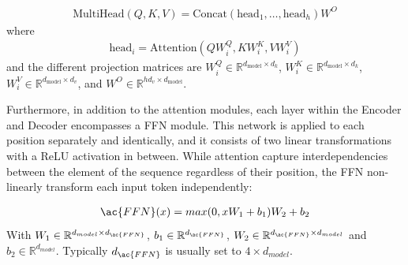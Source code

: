 \begin{align}
\text{MultiHead}(Q, K, V) = \text{Concat}(\text{head}_1, \dots, \text{head}_h)W^O
\end{align}
where
\begin{align}
\text{head}_i = \text{Attention}(QW_i^Q, KW_i^K, VW_i^V)
\end{align}
and the different projection matrices are $W_i^Q \in \mathbb{R}^{d_{\text{model}} \times d_k}$, $W_i^K \in \mathbb{R}^{d_{\text{model}} \times d_k}$, $W_i^V \in \mathbb{R}^{d_{\text{model}} \times d_v}$, and $W^O \in \mathbb{R}^{hd_{v} \times d_{\text{model}}}$.


Furthermore, in addition to the attention modules, each layer within the Encoder and Decoder encompasses a \ac{FFN} module. This network is applied to each position separately and identically, and it consists of two linear transformations with a \ac{ReLU} activation in between. While attention capture interdependencies between the element of the sequence regardless of their position, the \ac{FFN} non-linearly transform each input token independently:

\begin{align}
    \ac{FFN}(x) = max(0,xW_1 + b_1)W_2 + b_2
    \label{equation:FFN}
\end{align}
With $W_1 \in \mathbb{R}^{d_{model} \times d_{\ac{FFN}}}$, $b_1 \in \mathbb{R}^{d_{\ac{FFN}}}$, $W_2 \in \mathbb{R}^{d_{\ac{FFN}} \times d_{model}}$ and $b_2 \in \mathbb{R}^{d_{model}}$. Typically $d_{\ac{FFN}}$ is usually set to $4 \times d_{model}$.

